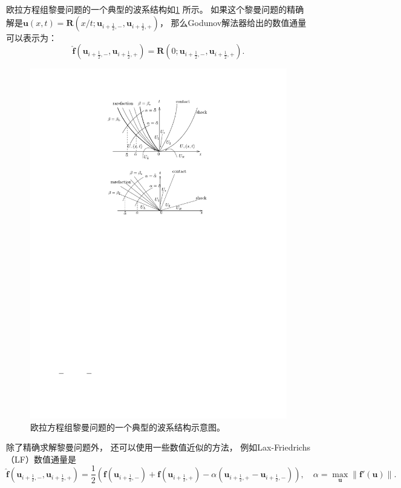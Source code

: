 欧拉方程组黎曼问题的一个典型的波系结构如\cref{fig:RP_wave_pattern} 所示。
如果这个黎曼问题的精确解是${\bm{u}}(x,t)={\bm R}(x/t;{\bm u}_{i+\frac{1}{2},-},{\bm u}_{i+\frac{1}{2},+})$，
那么Godunov解法器给出的数值通量可以表示为：
\begin{equation}
  \hat{\bm{f}}({\bm{u}}_{i+\frac 12,-},{\bm{u}}_{i+\frac 12,+}) = {\bm R}(0;{\bm u}_{i+\frac{1}{2},-},{\bm u}_{i+\frac{1}{2},+}).
\end{equation}

\begin{figure}[htbp]
  \centering
  \includegraphics[width=\textwidth]{fig/RP_wave_pattern.pdf}
  \caption{欧拉方程组黎曼问题的一个典型的波系结构示意图。
  }
  \label{fig:RP_wave_pattern}
\end{figure}

除了精确求解黎曼问题外，
还可以使用一些数值近似的方法，
例如Lax-Friedrichs（LF）数值通量是
\begin{equation}
  \hat{\bm{f}}({\bm{u}}_{i+\frac 12,-},{\bm{u}}_{i+\frac 12,+}) = \frac{1}{2}\left(\bm{f}({\bm{u}}_{i+\frac 12,-}) + \bm{f}({\bm{u}}_{i+\frac 12,+}) - \alpha \left({\bm{u}}_{i+\frac 12,+}-{\bm{u}}_{i+\frac 12,-}\right)\right), \quad \alpha = \max_{\bm{u}} \|\bm{f}'(\bm{u})\|.
\end{equation}

